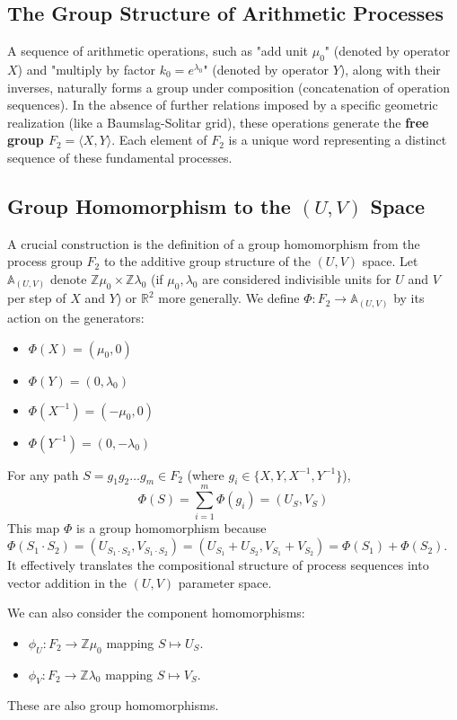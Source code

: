 \documentclass{article}[a4paper,12pt]
\begin{document}
\subsection{The Group Structure of Arithmetic Processes}
A sequence of arithmetic operations, such as "add unit $\mu_0$" (denoted by operator $X$) and "multiply by factor $k_0 = e^{\lambda_0}$" (denoted by operator $Y$), along with their inverses, naturally forms a group under composition (concatenation of operation sequences). In the absence of further relations imposed by a specific geometric realization (like a Baumslag-Solitar grid), these operations generate the \textbf{free group $F_2 = \langle X, Y \rangle$}. Each element of $F_2$ is a unique word representing a distinct sequence of these fundamental processes.

\subsection{Group Homomorphism to the $(U,V)$ Space}
A crucial construction is the definition of a group homomorphism from the process group $F_2$ to the additive group structure of the $(U,V)$ space. Let $\mathbb{A}_{(U,V)}$ denote $\mathbb{Z}\mu_0 \times \mathbb{Z}\lambda_0$ (if $\mu_0, \lambda_0$ are considered indivisible units for $U$ and $V$ per step of $X$ and $Y$) or $\mathbb{R}^2$ more generally.
We define $\Phi: F_2 \to \mathbb{A}_{(U,V)}$ by its action on the generators:
\begin{itemize}
    \item $\Phi(X) = (\mu_0, 0)$
    \item $\Phi(Y) = (0, \lambda_0)$
    \item $\Phi(X^{-1}) = (-\mu_0, 0)$
    \item $\Phi(Y^{-1}) = (0, -\lambda_0)$
\end{itemize}
For any path $S = g_1 g_2 \dots g_m \in F_2$ (where $g_i \in \{X, Y, X^{-1}, Y^{-1}\}$),
\[ \Phi(S) = \sum_{i=1}^m \Phi(g_i) = (U_S, V_S) \]
This map $\Phi$ is a group homomorphism because $\Phi(S_1 \cdot S_2) = (U_{S_1 \cdot S_2}, V_{S_1 \cdot S_2}) = (U_{S_1} + U_{S_2}, V_{S_1} + V_{S_2}) = \Phi(S_1) + \Phi(S_2)$. It effectively translates the compositional structure of process sequences into vector addition in the $(U,V)$ parameter space.

We can also consider the component homomorphisms:
\begin{itemize}
    \item $\phi_U: F_2 \to \mathbb{Z}\mu_0$ mapping $S \mapsto U_S$.
    \item $\phi_V: F_2 \to \mathbb{Z}\lambda_0$ mapping $S \mapsto V_S$.
\end{itemize}
These are also group homomorphisms.
\end{document}
